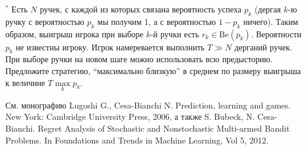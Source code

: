 \begin{comment}
\begin{remark} Необходимость построения нижних оценок возникает тогда, когда случайная последовательность генерируется одним из распределений $\{P_i\}$ (неизвестно каким), а наилучшая стратегия игрока зависит от вида истинного $P_k \in \{P_i\}$, о котором нет никакой информации  . 
\end{remark}


\begin{problem}[Многорукие бандиты--1]
\end{problem}

ЗАДАЧА ПРО МНОГОРУКИХ БАНДИТОВ НА ОЦЕНКУ СНИЗУ ПО 5-й ЛЕКЦИИИ Yishay Mansour (в рамках курса Advanced Topics in Machine Learning and Algorithmic Game Theory), в которой в двух местах есть опечатка вместо + там стоит -
\end{comment}
\begin{problem}$^*$
Есть $N$ ручек, с каждой из которых связана вероятность успеха $p_k$ (дергая $k$-ю ручку с вероятностью $p_k$ мы получим 1, а с вероятностью $1-p_k$ ничего).
Таким образом, выигрыш игрока при выборе $k$-й ручки есть $r_k \in \text{Be}(p_k)$.    
Вероятности $p_k$ не известны игроку. Игрок намеревается выполнить $T \gg N$ дерганий ручек. При выборе ручки на новом шаге можно использовать всю предысторию. Предложите стратегию, ``максимально близкую'' в среднем по размеру выигрыша к величине $T \max \limits_k p_k$.

\begin{remark} См. монографию Lugoshi G., Cesa-Bianchi N. Prediction, learning and games. New York: Cambridge University Press, 2006, а также S. Bubeck, N. Cesa-Bianchi. Regret Analysis of Stochastic and Nonstochastic Multi-armed Bandit Problems. In Foundations and Trends in Machine Learning, Vol 5, 2012. 
\end{remark}
\end{problem}



